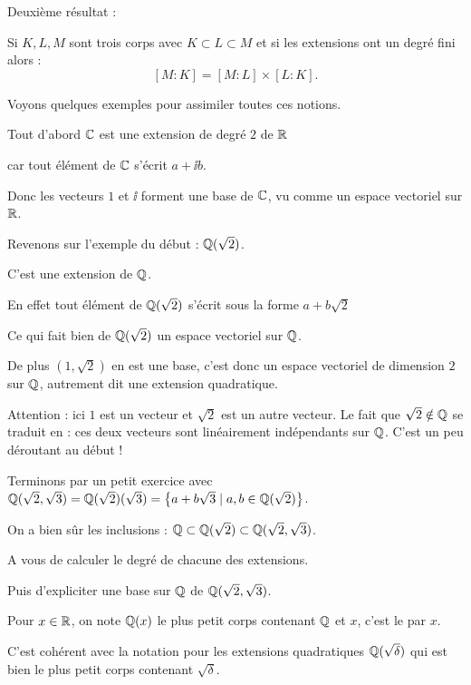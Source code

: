 \change
Deuxième résultat : 

Si $K,L,M$ sont trois corps avec $K \subset L \subset M$
et si les extensions ont un degré fini alors :
$$[M:K] = [M:L] \times [L:K].$$


\diapo

Voyons quelques exemples pour assimiler toutes ces notions.

Tout d'abord 
$\mathbb{C}$ est une extension de degré $2$ de $\mathbb{R}$ 

\change
car tout élément de $\mathbb{C}$ s'écrit $a+\ii b$. 
  
\change
Donc les vecteurs $1$ et $\ii$ forment une base de $\mathbb{C}$, vu comme un espace vectoriel sur $\mathbb{R}$.

\change
Revenons sur l'exemple du début : $\mathbb{Q}(\sqrt 2)$. 

C'est une extension de $\mathbb{Q}$.

\change
En effet tout élément de $\mathbb{Q}(\sqrt 2)$ s'écrit sous la forme $a+b\sqrt 2$

\change
Ce qui fait bien de $\mathbb{Q}(\sqrt 2)$ un espace vectoriel sur $\mathbb{Q}$.

\change
De plus $(1,\sqrt 2)$ en est une base, c'est donc un espace vectoriel  de dimension $2$ sur $\mathbb{Q}$, autrement dit
une extension quadratique.

\change  
Attention : ici $1$ est un vecteur 
  et $\sqrt 2$ est un autre vecteur. Le fait que $\sqrt{2} \notin \mathbb{Q}$ se 
  traduit en : ces deux vecteurs sont linéairement indépendants sur $\mathbb{Q}$. 
  C'est un peu déroutant au début !
 
\change
Terminons par un petit exercice avec $\mathbb{Q}(\sqrt 2, \sqrt 3) = \mathbb{Q}(\sqrt 2)(\sqrt 3) =
\big\{ a+ b \sqrt 3 \mid a,b \in \mathbb{Q}(\sqrt 2) \big\}$.

\change
On a bien sûr les inclusions : 
$\mathbb{Q} \subset \mathbb{Q}(\sqrt 2) \subset \mathbb{Q}(\sqrt 2, \sqrt 3)$.

\change
A vous de calculer le degré de chacune des extensions. 

\change
Puis d'expliciter une base sur $\mathbb{Q}$ de 
$\mathbb{Q}(\sqrt 2, \sqrt 3)$.


\diapo

Pour $x\in\mathbb{R}$, on note $\mathbb{Q}(x)$ le plus petit corps 
contenant $\mathbb{Q}$ et $x$, c'est le  par $x$.

\change
C'est cohérent avec la notation pour les 
extensions quadratiques $\mathbb{Q}(\sqrt{\delta})$ qui est bien le plus petit 
corps contenant $\sqrt\delta$.

